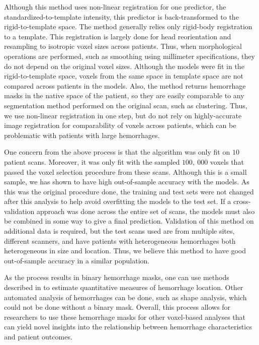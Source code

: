 \documentclass{elsarticle_nonatbib}\usepackage[]{graphicx}\usepackage[]{color}
\begin{document}
Although this method uses non-linear registration for one predictor, the standardized-to-template intensity, this predictor is back-transformed to the rigid-to-template space.  The method generally relies only rigid-body registration to a template.  This registration is largely done for head reorientation and resampling to isotropic voxel sizes across patients.  Thus, when morphological operations  are performed, such as smoothing using millimeter specifications, they do not depend on the original voxel sizes.  Although the models were fit in the rigid-to-template space, voxels from the same space in template space are not compared across patients in the models.  Also, the method returns hemorrhage masks in the native space of the patient, so they are easily comparable to any segmentation method performed on the original scan, such as clustering.  Thus, we use non-linear registration in one step, but do not rely on highly-accurate image registration for comparability of voxels across patients, which can be problematic with patients with large hemorrhages.


One concern from the above process is that the algorithm was only fit on $10$ patient scans.  Moreover, it was only fit with the sampled $100,~000$ voxels that passed the voxel selection procedure from these scans.  Although this is a small sample, we has shown to have high out-of-sample accuracy with the models.  As this was the original procedure done, the training and test sets were not changed after this analysis to help avoid overfitting the models to the test set.  If a cross-validation approach was done across the entire set of scans,  the models must also be combined in some way to give a final prediction.  Validation of this method on additional data is required, but the test scans used are from multiple sites, different scanners, and have patients with heterogeneous hemorrhages both heterogeneous in size and location.  Thus, we believe this method to have good out-of-sample accuracy in a similar population.

As the process results in binary hemorrhage masks, one can use methods described in \citet{muschelli2015quantitative} to estimate quantitative measures of hemorrhage location.  Other automated analysis of hemorrhages can be done, such as shape analysis, which could not be done without a binary mask.  Overall, this process allows for researchers to use these hemorrhage masks for other voxel-based analyses that can yield novel insights into the relationship between hemorrhage characteristics and patient outcomes.
\end{document}
